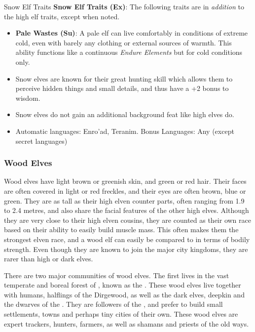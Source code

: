 \begin{35e}{Snow Elf Traits}
  \textbf{Snow Elf Traits (Ex)}: The following traits are in \emph{addition}
  to the high elf traits, except when noted.
  \begin{itemize}[noitemsep]
    \item \textbf{Pale Wastes (Su)}: A pale elf can live comfortably in
      conditions of extreme cold, even with barely any clothing or external
      sources of warmth. This ability functions like a continuous \emph{Endure
      Elements} but for cold conditions only.
    \item Snow elves are known for their great hunting skill which allows them
      to perceive hidden things and small details, and thus have a +2 bonus to
      wisdom.
    \item Snow elves do not gain an additional background feat like high elves
      do.
    \item Automatic languages: Enro'ad, Teranim. Bonus Languages: Any (except
      secret languages)
  \end{itemize}
\end{35e}

\subsubsection{Wood Elves}
\label{sec:Wood Elves}

Wood elves have light brown or greenish skin, and green or red hair. Their
faces are often covered in light or red freckles, and their eyes are often
brown, blue or green. They are as tall as their high elven counter parts,
often ranging from 1.9 to 2.4 metres, and also share the facial features of
the other high elves. Although they are very close to their high elven
cousins, they are counted as their own race based on their ability to easily
build muscle mass. This often makes them the strongest elven race, and a wood
elf can easily be compared to  in terms of bodily
strength. Even though they are known to join the major city kingdoms, they are
rarer than high or dark elves.

There are two major communities of wood elves. The first lives in the vast
temperate and boreal forest of , known as the
. These wood elves live together with humans, halflings
of the Dirgewood, as well as the dark elves, deepkin and the dwarves of the
. They are followers of the ,
and prefer to build small settlements, towns and perhaps tiny cities of their
own. These wood elves are expert trackers, hunters, farmers, as well as shamans
and priests of the old ways.


